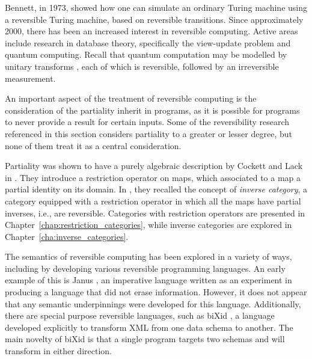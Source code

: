 Bennett, in 1973,  \cite{bennett:1973reverse} showed how one can simulate an ordinary Turing machine
using a reversible Turing machine, based on reversible transitions. Since approximately 2000, there has
been an increased interest in reversible computing. Active areas include research in database
theory, specifically the view-update problem
\cite{Pierce06:lenses,Pierce05:combinators,Johnson08:reverse} and quantum computing. Recall that
quantum computation may be modelled by unitary transforms
\cite{neilsen2000:QuantumComputationAndInfo}, each of which is reversible, followed by an
irreversible measurement.

An important aspect of the treatment of reversible computing is the consideration of the partiality
inherit in programs, as it is possible for programs to never provide a result for certain
inputs. Some of the reversibility research referenced in this section considers partiality to a
greater or lesser degree, but none of them treat it as a central consideration.

Partiality was shown to have a purely algebraic description by Cockett and Lack in
\cite{cockett2002:restcategories1,cockettlack2003:restcategories2,cockettlack2004:restcategories3}. They
introduce a restriction  operator on maps, which associated to a map a partial identity on its
domain. In \cite{cockett2002:restcategories1}, they recalled the concept of \emph{inverse
  category}, a category equipped with a restriction operator in which all the maps have partial
inverses, i.e., are reversible. Categories with restriction operators are presented in
Chapter~\ref{chap:restriction_categories}, while inverse categories are explored in
Chapter~\ref{cha:inverse_categories}.

The semantics of reversible computing has been explored in a variety of ways, including by
developing various reversible programming languages. An early example of this is Janus
\cite{lutz1986janus}, an imperative language written as an experiment in producing a language that
did not erase information. However, it does not appear that any semantic underpinnings were
developed for this language. Additionally, there are special purpose reversible languages, such as
biXid \cite{bixid06}, a language developed explicitly to transform XML \cite{xml} from one data
schema to another. The main novelty of biXid is that a single program targets two schemas and will
transform in either direction.


